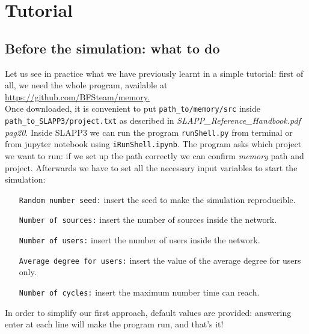 \section{Tutorial}\label{sec:tutorial}
\subsection{Before the simulation: what to do}\label{subsec:before}
Let us see in practice what we have previously learnt in a simple tutorial:
first of all, we need the whole program, available at
\url{https://github.com/BFSteam/memory.}\\
Once downloaded, it is convenient to put \texttt{path\_to/memory/src} inside
\texttt{path\_to\_SLAPP3/project.txt} as described in
\textit{SLAPP\_Reference\_Handbook.pdf pag20}.
Inside SLAPP3 we can run the program \texttt{runShell.py} from terminal
or from jupyter notebook using \texttt{iRunShell.ipynb}.
The program asks which project we want to run: if we set up the path correctly
we can confirm \textit{memory} path and project.
Afterwards we have to set all the necessary input variables to start
the simulation:
\begin{itemize}
\item[\texttt{Random number seed:}] insert the seed to make the simulation
  reproducible.
\item[\texttt{Number of sources:}]insert the number of sources inside
  the network.
\item[\texttt{Number of users:}]insert the number of users inside the
  network.
\item[\texttt{Average degree for users:}]insert the value of the average
  degree for users only.
\item[\texttt{Number of cycles:}]insert the maximum number time can reach.
\end{itemize}
In order to simplify our first approach, default values are provided:
answering enter at each line will make the program run, and that's it!\\

